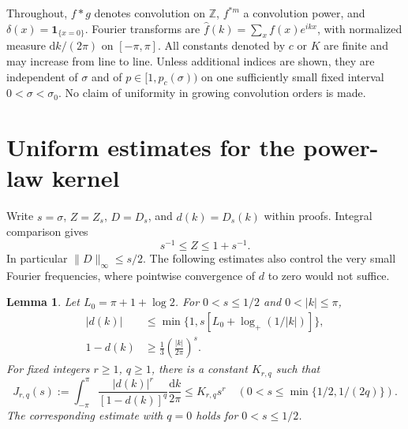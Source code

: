 \documentclass[11pt]{article}
\newtheorem{lemma}[theorem]{Lemma}
\theoremstyle{definition}
\newcommand{\Z}{\mathbb Z}
\newcommand{\ind}{\mathbf 1}
\newcommand{\intk}{\int_{-\pi}^{\pi}}
\newcommand{\dm}{\frac{\mathrm dk}{2\pi}}
\begin{document}
Throughout, $f*g$ denotes convolution on $\Z$, $f^{*m}$ a convolution
power, and $\delta(x)=\ind_{\{x=0\}}$. Fourier transforms are
$\widehat f(k)=\sum_x f(x)e^{ikx}$, with normalized measure $\mathrm dk/(2\pi)$
on $[-\pi,\pi]$. All constants denoted by $c$ or $K$ are finite and may
increase from line to line. Unless additional indices are shown, they are
independent of $\sigma$ and of $p\in[1,p_c(\sigma))$ on one sufficiently
small fixed interval $0<\sigma<\sigma_0$. No claim of uniformity in growing
convolution orders is made.

\section{Uniform estimates for the power-law kernel}\label{sec:kernel}

Write $s=\sigma$, $Z=Z_s$, $D=D_s$, and $d(k)=\widehat D_s(k)$ within proofs.
Integral comparison gives
\begin{equation}\label{eq:zeta-bounds}
 s^{-1}\le Z\le1+s^{-1}.
\end{equation}
In particular $\|D\|_\infty\le s/2$. The following estimates also control
the very small Fourier frequencies, where pointwise convergence of $d$ to
zero would not suffice.

\begin{lemma}\label{lem:fourier}
Let $L_0=\pi+1+\log2$. For $0<s\le1/2$ and $0<|k|\le\pi$,
\begin{align}
 |d(k)|&\le \min\{1,s[L_0+\log_+(1/|k|)]\},\label{eq:log-bound}\\
 1-d(k)&\ge\frac13\left(\frac{|k|}{2\pi}\right)^s.\label{eq:gap}
\end{align}
For fixed integers $r\ge1$, $q\ge1$, there is a constant $K_{r,q}$ such
that
\begin{equation}\label{eq:J}
 J_{r,q}(s):=\intk\frac{|d(k)|^r}{[1-d(k)]^q}\dm
 \le K_{r,q}s^r
 \quad\left(0<s\le\min\{1/2,1/(2q)\}\right).
\end{equation}
The corresponding estimate with $q=0$ holds for $0<s\le1/2$.
\end{lemma}
\end{document}
